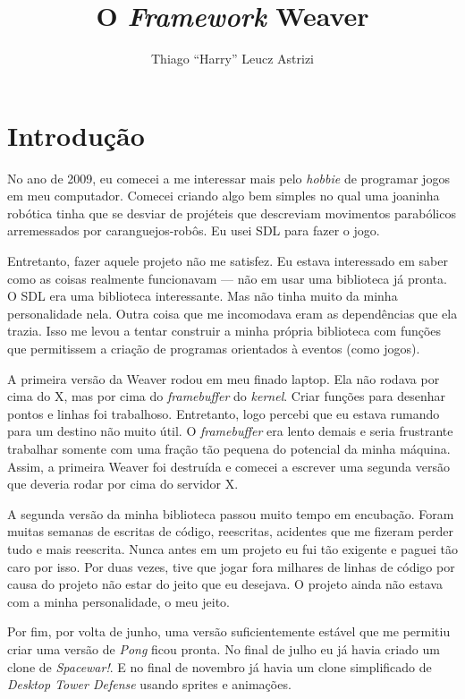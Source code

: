 \documentclass[11pt,a4paper]{book}
\title{O \textit{Framework} Weaver}
\author{Thiago ``Harry'' Leucz Astrizi}
\begin{document}
\maketitle

\chapter*{Introdução}

No ano de 2009, eu comecei a me interessar mais pelo \textit{hobbie}
de programar jogos em meu computador. Comecei criando algo bem simples
no qual uma joaninha robótica tinha que se desviar de projéteis que
descreviam movimentos parabólicos arremessados por
caranguejos-robôs. Eu usei SDL para fazer o jogo.

Entretanto, fazer aquele projeto não me satisfez. Eu estava
interessado em saber como as coisas realmente funcionavam --- não em
usar uma biblioteca já pronta. O SDL era uma biblioteca
interessante. Mas não tinha muito da minha personalidade nela. Outra
coisa que me incomodava eram as dependências que ela trazia. Isso me
levou a tentar construir a minha própria biblioteca com funções que
permitissem a criação de programas orientados à eventos (como jogos).

A primeira versão da Weaver rodou em meu finado laptop. Ela não rodava
por cima do X, mas por cima do \textit{framebuffer} do
\textit{kernel}. Criar funções para desenhar pontos e linhas foi
trabalhoso. Entretanto, logo percebi que eu estava rumando para um
destino não muito útil. O \textit{framebuffer} era lento demais e
seria frustrante trabalhar somente com uma fração tão pequena do
potencial da minha máquina. Assim, a primeira Weaver foi destruída e
comecei a escrever uma segunda versão que deveria rodar por cima do
servidor X.

A segunda versão da minha biblioteca passou muito tem\-po em
en\-cu\-ba\-ção. Foram muitas semanas de escritas de código, reescritas,
acidentes que me fizeram perder tudo e mais re\-es\-crita. Nunca antes em
um projeto eu fui tão exigente e paguei tão caro por isso. Por duas
vezes, tive que jogar fora milhares de linhas de código por causa do
projeto não estar do jeito que eu desejava. O projeto ainda não estava
com a minha personalidade, o meu jeito. 

Por fim, por volta de junho, uma versão suficientemente estável que me
permitiu criar uma versão de \textit{Pong} ficou pronta. No final de
julho eu já havia criado um clone de \textit{Spacewar!}. E no final de
novembro já havia um clone simplificado de\textit{ Desktop Tower Defense}
usando sprites e animações.
\end{document}
